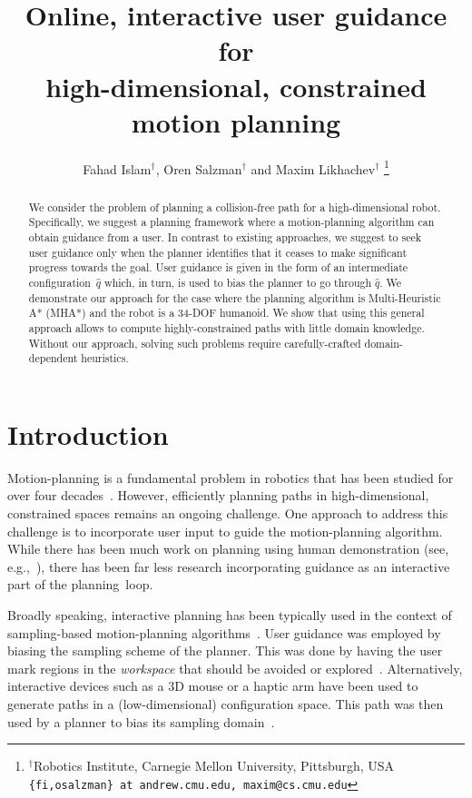 \documentclass{article}
\title{	Online, interactive user guidance for \\
		high-dimensional, constrained motion planning }
\author{Fahad Islam$^{\dag}$, Oren Salzman$^{\dag}$ and Maxim Likhachev$^{\dag}$%
  \thanks{$^{\dag}$Robotics Institute, Carnegie Mellon University,
    Pittsburgh, USA
    {\tt\small \{fi,osalzman\} at andrew.cmu.edu, maxim@cs.cmu.edu}
  }%
}
\begin{document}
\maketitle
\thispagestyle{empty}
\pagestyle{empty}


\begin{abstract}
We consider the problem of planning a collision-free path for a high-dimensional robot.
Specifically, we suggest a planning framework where a motion-planning algorithm can obtain guidance from a user.
In contrast to existing approaches, we suggest to seek user guidance only when the planner identifies that it ceases to make significant progress towards the goal.
User guidance is given in the form of an intermediate configuration~$\hat{q}$ which, in turn, is used to bias the planner to go through $\hat{q}$.
We demonstrate our approach for the case where the planning algorithm is Multi-Heuristic A* (MHA*) and the robot is a 34-DOF humanoid.
We show that using this general approach allows to compute highly-constrained paths with little domain knowledge.
Without our approach, solving such problems require carefully-crafted domain-dependent heuristics. 
\end{abstract}



\section{Introduction}
\label{sec:intro}

Motion-planning is a fundamental problem in robotics that has been studied for over four decades~\cite{CBHKKLT05,L06,S04}.
However, efficiently planning paths in high-dimensional, constrained spaces remains an ongoing challenge.
One approach to address this challenge is to incorporate user input to guide the motion-planning algorithm.
While there has been much work on planning using human demonstration 
(see, e.g.,~\cite{ACVB09,HS16,PHCL16,SHLA16,YA17}), 
there has been far less research incorporating guidance as an interactive part of the planning~loop.

Broadly speaking, interactive planning has been typically used in the context of sampling-based motion-planning algorithms~\cite{L06}.
User guidance was employed by biasing the sampling scheme of the planner.
This was done by having the user mark regions in the \emph{workspace} that should be avoided or 
explored~\cite{DSJA14,MTMKDC15,YPB15,RSL17}.
Alternatively, interactive devices such as a 3D mouse or a haptic arm have been used to generate paths in a (low-dimensional) configuration space. This path was then used by a planner to bias its 
sampling domain~\cite{BTFF16,FTF09,TFF12}.
\end{document}
